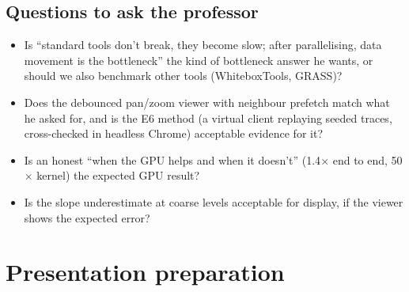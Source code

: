 ﻿\documentclass[11pt,a4paper]{article}
\begin{document}
\subsection{Questions to ask the professor}
\begin{itemize}
  \item Is ``standard tools don't break, they become slow; after parallelising, data movement is the bottleneck'' the kind
  of bottleneck answer he wants, or should we also benchmark other tools (WhiteboxTools, GRASS)?
  \item Does the debounced pan/zoom viewer with neighbour prefetch match what he asked for, and is the E6 method (a
  virtual client replaying seeded traces, cross-checked in headless Chrome) acceptable evidence for it?
  \item Is an honest ``when the GPU helps and when it doesn't'' (1.4$\times$ end to end, 50$\times$ kernel) the expected GPU result?
  \item Is the slope underestimate at coarse levels acceptable for display, if the viewer shows the expected error?
\end{itemize}

\section{Presentation preparation}
\end{document}
